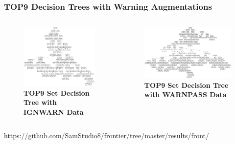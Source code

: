 \documentclass{beamer}
\begin{document}
\begin{frame}[t]
    \frametitle{TOP9 Decision Trees with Warning Augmentations}

    \begin{columns}[c]
    \column{6cm}
        \begin{figure}[htbp!]
            \centering
            \includegraphics[width=1\textwidth]{img/TOP9_IGNWARN_1.png}
            \tiny{\caption{\textbf{TOP9 Set Decision Tree with IGNWARN Data}}}
        \end{figure}
    \column{6cm}
        \begin{figure}[htbp!]
            \centering
            \includegraphics[width=1\textwidth]{img/TOP9_WARNPASS_1.png}
            \tiny{\caption{\textbf{TOP9 Set Decision Tree with WARNPASS Data}}}
        \end{figure}
    \end{columns}
    \centering
    \tiny{https://github.com/SamStudio8/frontier/tree/master/results/front/}
\end{frame}
\end{document}
